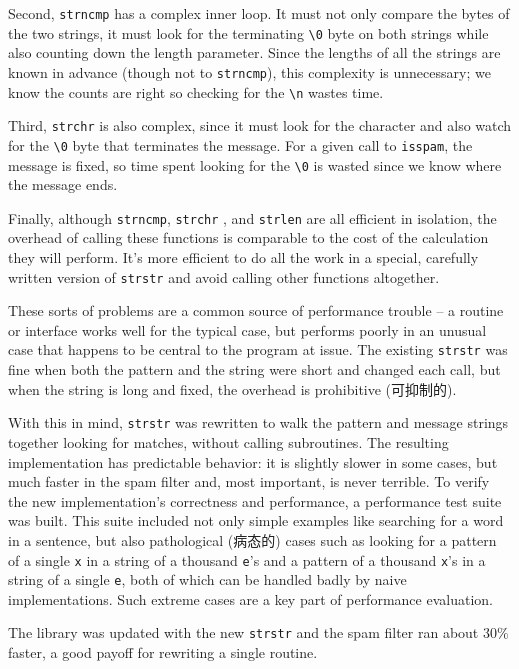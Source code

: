 Second, \verb'strncmp' has a complex inner loop. It must not only compare
the bytes of the two strings, it must look for the terminating \verb'\0'
byte on both strings while also counting down the length parameter. Since
the lengths of all the strings are known in advance (though not to
\verb'strncmp'),
this complexity is unnecessary; we know the counts are right so
checking for the \verb'\n' wastes time.

Third, \verb'strchr' is also complex, since it must look for the character
and also watch for the \verb'\0' byte that terminates the message. For a
given call to \verb'isspam', the message is fixed, so time spent looking
for the \verb'\0' is wasted since we know where the message ends.

Finally, although \verb'strncmp', \verb'strchr' , and \verb'strlen' are all
efficient in isolation, the overhead of calling these functions is
comparable to the cost of the calculation they will perform. It's more
efficient to do all the work in a special, carefully written version of
\verb'strstr' and avoid calling other functions altogether.

These sorts of problems are a common source of performance trouble -- a
routine or interface works well for the typical case, but performs poorly
in an unusual case that happens to be central to the program at issue. The
existing \verb'strstr' was fine when both the pattern and the string were
short and changed each call, but when the string is long and fixed, the
overhead is prohibitive (可抑制的).

With this in mind, \verb'strstr' was rewritten to walk the pattern and
message strings together looking for matches, without calling subroutines.
The resulting implementation has predictable behavior: it is slightly
slower in some cases, but much faster in the spam filter and, most
important, is never terrible. To verify the new implementation's
correctness and performance, a performance test suite was built.  This
suite included not only simple examples like searching for a word in a
sentence, but also pathological (病态的) cases such as looking for a
pattern of a single \verb'x' in a string of a thousand \verb'e''s and a
pattern of a thousand \verb'x''s in a string of a single \verb'e', both of
which can be handled badly by naive implementations. Such extreme cases are
a key part of performance evaluation.

The library was updated with the new \verb'strstr' and the spam filter ran
about $30\%$ faster, a good payoff for rewriting a single routine.

